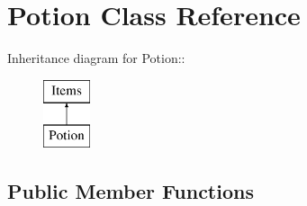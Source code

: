 \hypertarget{classPotion}{
\section{Potion Class Reference}
\label{classPotion}
}
Inheritance diagram for Potion::\begin{figure}[H]
\begin{center}
\leavevmode
\includegraphics[height=2cm]{classPotion}
\end{center}
\end{figure}
\subsection*{Public Member Functions}
